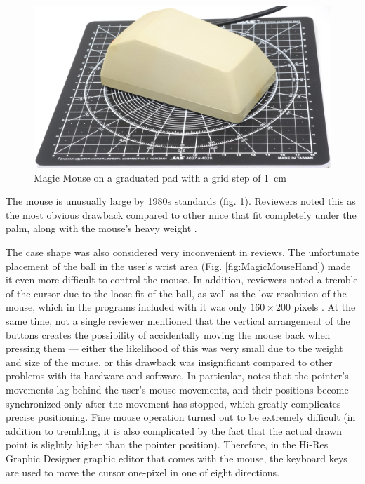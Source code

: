 \documentclass[11pt, a4paper]{article}
\begin{document}
\begin{figure}[h]
    \centering
    \includegraphics[scale=0.54]{1985_smc_contriver_magic_mouse/size_30.jpg}
    \caption{Magic Mouse on a graduated pad with a grid step of 1~cm}
    \label{fig:MagicMouseSize}
\end{figure}

The mouse is unusually large by 1980s standards (fig. \ref{fig:MagicMouseSize}). Reviewers noted this as the most obvious drawback compared to other mice that fit completely under the palm, along with the mouse's heavy weight \cite{SMC_Mouse_Commodore3}.

The case shape was also considered very inconvenient in reviews. The unfortunate placement of the ball in the user's wrist area (Fig. \ref{fig:MagicMouseHand}) made it even more difficult to control the mouse. In addition, reviewers noted a tremble of the cursor due to the loose fit of the ball, as well as the low resolution of the mouse, which in the programs included with it was only $160 \times 200$ pixels \cite{SMC_Mouse_Commodore3}. At the same time, not a single reviewer mentioned that the vertical arrangement of the buttons creates the possibility of accidentally moving the mouse back when pressing them --- either the likelihood of this was very small due to the weight and size of the mouse, or this drawback was insignificant compared to other problems with its hardware and software. In particular, \cite{SMC_Mouse_Commodore3} notes that the pointer's movements lag behind the user's mouse movements, and their positions become synchronized only after the movement has stopped, which greatly complicates precise positioning. Fine mouse operation turned out to be extremely difficult (in addition to trembling, it is also complicated by the fact that the actual drawn point is slightly higher than the pointer position). Therefore, in the Hi-Res Graphic Designer graphic editor that comes with the mouse, the keyboard keys are used to move the cursor one-pixel in one of eight directions.
\end{document}
